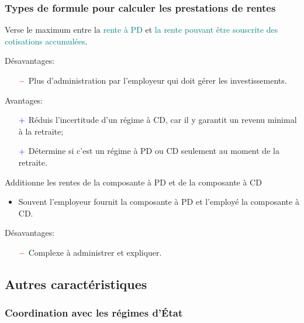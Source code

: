 \documentclass[10pt, french]{article}
\begin{document}
\begin{multicols*}{3}
\subsubsection*{Types de formule pour calculer les prestations de rentes}

\begin{definitionNOHFILL}
Verse le maximum entre la \textcolor{teal}{rente à PD} et \textcolor{teal}{la rente pouvant être souscrite des cotisations accumulées}.


Désavantages:
\begin{itemize}
	\item[$\color{red}-$]	Plus d'administration par l'employeur qui doit gérer les investissements.
\end{itemize}

Avantages:
\begin{itemize}
	\item[$\color{blue}+$]	Réduis l'incertitude d'un régime à CD, car il y garantit un revenu minimal à la retraite;
	\item[$\color{blue}+$]	Détermine si c'est un régime à PD ou CD seulement au moment de la retraite.
\end{itemize}
\end{definitionNOHFILL}

\begin{definitionNOHFILL}[Combiné]
Additionne les rentes de la composante à PD et de la composante à CD

\begin{itemize}[leftmargin = *]
	\item	Souvent l'employeur fournit la composante à PD et l'employé la composante à CD.
\end{itemize}

Désavantages:
\begin{itemize}
	\item[$\color{red}-$]	Complexe à administrer et expliquer.
\end{itemize}
\end{definitionNOHFILL}

\columnbreak

\subsection*{Autres caractéristiques}

\subsubsection*{Coordination avec les régimes d'État}

\end{multicols*}
\end{document}
